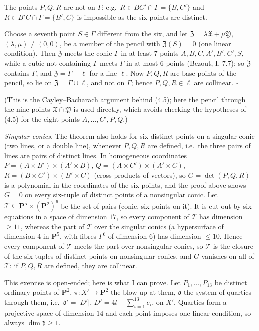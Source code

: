 \documentclass[11pt]{article}
\begin{document}
The points $P,Q,R$ are not on $\Gamma$: e.g.\ $R\in BC'\cap\Gamma=\{B,C'\}$ and $R\in B'C\cap\Gamma=\{B',C\}$ is impossible as the six points are distinct.

Choose a seventh point $S\in\Gamma$ different from the six, and let $\mathfrak Z=\lambda\mathfrak X+\mu\mathfrak Y$, $(\lambda,\mu)\ne(0,0)$, be a member of the pencil with $\mathfrak Z(S)=0$ (one linear condition). Then $\mathfrak Z$ meets the conic $\Gamma$ in at least $7$ points $A,B,C,A',B',C',S$, while a cubic not containing $\Gamma$ meets $\Gamma$ in at most $6$ points (Bezout, I, 7.7); so $\mathfrak Z$ contains $\Gamma$, and $\mathfrak Z=\Gamma+\ell$ for a line $\ell$. Now $P,Q,R$ are base points of the pencil, so lie on $\mathfrak Z=\Gamma\cup\ell$, and not on $\Gamma$; hence $P,Q,R\in\ell$ are collinear. \hfill$\square$

(This is the Cayley--Bacharach argument behind (4.5); here the pencil through the nine points $\mathfrak X\cap\mathfrak Y$ is used directly, which avoids checking the hypotheses of (4.5) for the eight points $A,\dots,C',P,Q$.)

\emph{Singular conics.} The theorem also holds for six distinct points on a singular conic (two lines, or a double line), whenever $P,Q,R$ are defined, i.e.\ the three pairs of lines are pairs of distinct lines. In homogeneous coordinates $P=(A\times B')\times(A'\times B)$, $Q=(A\times C')\times(A'\times C)$, $R=(B\times C')\times(B'\times C)$ (cross products of vectors), so $G=\det(P,Q,R)$ is a polynomial in the coordinates of the six points, and the proof above shows $G=0$ on every six-tuple of distinct points of a nonsingular conic. Let $\mathcal T\subseteq\mathbf P^5\times(\mathbf P^2)^6$ be the set of pairs (conic, six points on it). It is cut out by six equations in a space of dimension $17$, so every component of $\mathcal T$ has dimension $\ge11$, whereas the part of $\mathcal T$ over the singular conics (a hypersurface of dimension $4$ in $\mathbf P^5$, with fibres $\Gamma^6$ of dimension $6$) has dimension $\le10$. Hence every component of $\mathcal T$ meets the part over nonsingular conics, so $\mathcal T$ is the closure of the six-tuples of distinct points on nonsingular conics, and $G$ vanishes on all of $\mathcal T$: if $P,Q,R$ are defined, they are collinear.

\pf
This exercise is open-ended; here is what I can prove. Let $P_1,\dots,P_{13}$ be distinct ordinary points of $\mathbf P^2$, $\pi:X'\to\mathbf P^2$ the blow-up at them, $\mathfrak d$ the system of quartics through them, i.e.\ $\mathfrak d'=|D'|$, $D'=4l-\sum_{i=1}^{13}e_i$, on $X'$. Quartics form a projective space of dimension $14$ and each point imposes one linear condition, so always $\dim\mathfrak d\ge1$.
\end{document}
